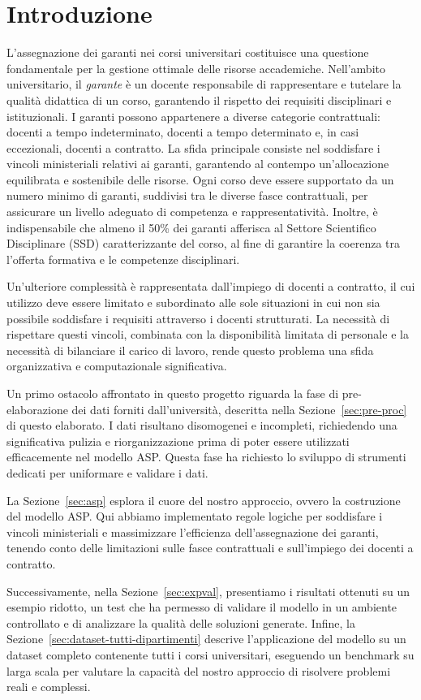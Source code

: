 \section{Introduzione}
\label{sec:introduction}

L'assegnazione dei garanti nei corsi universitari costituisce una 
questione fondamentale per la gestione ottimale delle risorse accademiche. 
Nell'ambito universitario, il \textit{garante} è un docente responsabile 
di rappresentare e tutelare la qualità didattica di un corso, garantendo 
il rispetto dei requisiti disciplinari e istituzionali. I garanti possono 
appartenere a diverse categorie contrattuali: docenti a tempo indeterminato, 
docenti a tempo determinato e, in casi eccezionali, docenti a contratto.
La sfida principale consiste nel soddisfare i vincoli ministeriali 
relativi ai garanti, garantendo al contempo un'allocazione equilibrata 
e sostenibile delle risorse. Ogni corso deve essere supportato da un 
numero minimo di garanti, suddivisi tra le diverse fasce contrattuali, 
per assicurare un livello adeguato di competenza e rappresentatività. 
Inoltre, è indispensabile che almeno il 50\% dei garanti afferisca al 
Settore Scientifico Disciplinare (SSD) caratterizzante del corso, al 
fine di garantire la coerenza tra l'offerta formativa e le competenze 
disciplinari.

Un'ulteriore complessità è rappresentata dall'impiego di docenti a 
contratto, il cui utilizzo deve essere limitato e subordinato alle 
sole situazioni in cui non sia possibile soddisfare i requisiti 
attraverso i docenti strutturati. La necessità di rispettare questi 
vincoli, combinata con la disponibilità limitata di personale e la 
necessità di bilanciare il carico di lavoro, rende questo problema 
una sfida organizzativa e computazionale significativa.

Un primo ostacolo affrontato in questo progetto riguarda la fase di 
pre-elaborazione dei dati forniti dall'università, descritta nella 
Sezione~\ref{sec:pre-proc} di questo elaborato. I dati risultano 
disomogenei e incompleti, richiedendo una significativa pulizia e 
riorganizzazione prima di poter essere utilizzati efficacemente nel 
modello ASP. Questa fase ha richiesto lo sviluppo di strumenti 
dedicati per uniformare e validare i dati.

La Sezione~\ref{sec:asp} esplora il cuore del nostro approccio, 
ovvero la costruzione del modello ASP. Qui abbiamo implementato 
regole logiche per soddisfare i vincoli ministeriali e massimizzare 
l'efficienza dell'assegnazione dei garanti, tenendo conto delle 
limitazioni sulle fasce contrattuali e sull'impiego dei docenti a contratto.

Successivamente, nella Sezione~\ref{sec:expval}, presentiamo 
i risultati ottenuti su un esempio ridotto, un test che ha permesso 
di validare il modello in un ambiente controllato e di analizzare la qualità 
delle soluzioni generate. Infine, la Sezione~\ref{sec:dataset-tutti-dipartimenti} descrive 
l'applicazione del modello su un dataset completo contenente tutti i corsi 
universitari, eseguendo un benchmark su larga scala per valutare la 
capacità del nostro approccio di risolvere problemi reali e complessi.